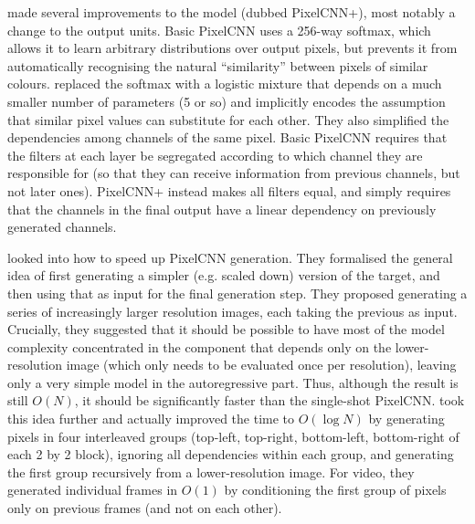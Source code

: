 \documentclass[11pt, a4paper, openany]{book}
\newcommand{\nquote}[1]{``{#1}''}
\begin{document}
\citet{pixelcnn++} made several improvements to the model (dubbed PixelCNN+), most notably a change to the output units. Basic PixelCNN uses a 256-way softmax, which allows it to learn arbitrary distributions over output pixels, but prevents it from automatically recognising the natural \nquote{similarity} between pixels of similar colours. \citet{pixelcnn++} replaced the softmax with a logistic mixture that depends on a much smaller number of parameters (5 or so) and implicitly encodes the assumption that similar pixel values can substitute for each other. They also simplified the dependencies among channels of the same pixel. Basic PixelCNN requires that the filters at each layer be segregated according to which channel they are responsible for (so that they can receive information from previous channels, but not later ones). PixelCNN+ instead makes all filters equal, and simply requires that the channels in the final output have a linear dependency on previously generated channels.

\citet{auxiliary} looked into how to speed up PixelCNN generation. They formalised the general idea of first generating a simpler (e.g. scaled down) version of the target, and then using that as input for the final generation step. They proposed generating a series of increasingly larger resolution images, each taking the previous as input. Crucially, they suggested that it should be possible to have most of the model complexity concentrated in the component that depends only on the lower-resolution image (which only needs to be evaluated once per resolution), leaving only a very simple model in the autoregressive part. Thus, although the result is still $O(N)$, it should be significantly faster than the single-shot PixelCNN. \citet{multiscale} took this idea further and actually improved the time to $O(\log N)$ by generating pixels in four interleaved groups (top-left, top-right, bottom-left, bottom-right of each 2 by 2 block), ignoring all dependencies within each group, and generating the first group recursively from a lower-resolution image. For video, they generated individual frames in $O(1)$ by conditioning the first group of pixels only on previous frames (and not on each other).
\end{document}
